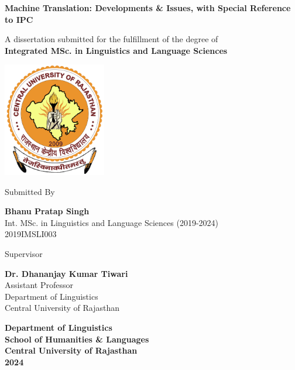 \begin{titlepage}
\singlespacing
\begin{center}
\Large
\textbf{Machine Translation: Developments \& Issues, with Special Reference to IPC}
\small
\vspace{1cm}

A dissertation submitted for the fulfillment of the degree of
\\\textbf{Integrated MSc. in Linguistics and Language Sciences}

\vspace{1cm}

\includegraphics[width=4.5cm]{images/curaj.png}

\vspace{1cm}

Submitted By

\vspace{0.1cm}

\textbf{Bhanu Pratap Singh}\\
Int. MSc. in Linguistics and Language Sciences (2019-2024)\\
2019IMSLI003

\vspace{1cm}

Supervisor

\vspace{0.1cm}

\textbf{Dr. Dhananjay Kumar Tiwari}\\
Assistant Professor\\
Department of Linguistics\\
Central University of Rajasthan

\vspace{1cm}

\textbf{Department of Linguistics\\
School of Humanities \& Languages\\
Central University of Rajasthan\\
2024
}

\end{center}
\doublespacing
\end{titlepage}